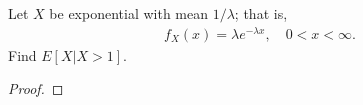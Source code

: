 \begin{problem}{3.13}
  Let $X$ be exponential with mean $1/\lambda$; that is,
  \begin{align*}
    f_{X}(x) = \lambda e^{-\lambda x}, \quad 0 < x < \infty.
  \end{align*}
  Find $E[X|X>1]$.
\end{problem}

\begin{proof}
\end{proof}
\newpage

